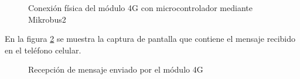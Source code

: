 	\begin{figure}[htbp!]
		\centering
		\caption{Conexión física del módulo 4G con microcontrolador mediante Mikrobus2}
		\label{fig:ConexionFisicaGSM}
	\end{figure}
	
En la figura \ref{fig:RecepcionMsj} se muestra la captura de pantalla que contiene el mensaje recibido en el teléfono celular.

	\begin{figure}[htbp!]
		\centering
		\caption{Recepción de mensaje enviado por el módulo 4G}
		\label{fig:RecepcionMsj}
	\end{figure}
	
	\clearpage
